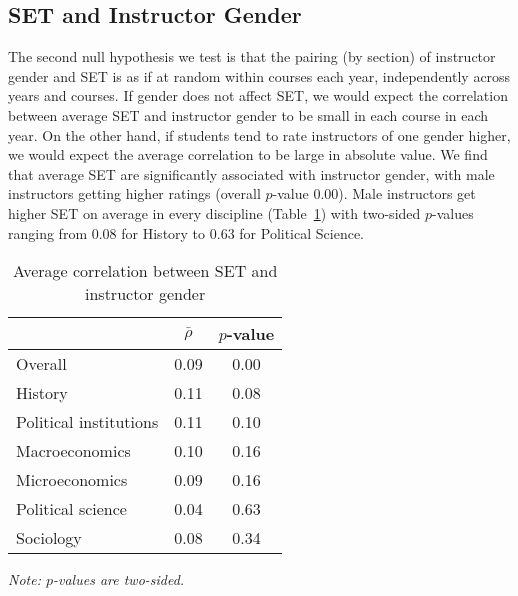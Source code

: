 \documentclass[12pt]{article}
\begin{document}
\subsection{SET and Instructor Gender} \label{sec:Fr-set-gender}
The second null hypothesis we test is that the pairing (by section) of 
instructor gender and SET is as if at random within courses each year, independently
across years and courses.
If gender does not affect SET, we would expect the correlation between average SET
and instructor gender to be small in each course in each year.
On the other hand, if students tend to rate instructors of one gender higher, we would
expect the average correlation to be large in absolute value.
We find that average SET are significantly associated with instructor gender, with male instructors
getting higher ratings (overall $p$-value 0.00). 
Male instructors get higher SET on average in every discipline  (Table~\ref{tab:instructorgender})
with two-sided $p$-values ranging from $0.08$ for 
History to $0.63$ for Political Science.

\begin{table}[htbp]
  \centering
  \footnotesize 
  \caption{Average correlation between SET and instructor gender}
    \begin{tabular}{lcc}
    \toprule 
                          & $\bar{\rho}$  & $p$-value     \\
   \midrule
    Overall &                 0.09       & 0.00     \\
    History &                 0.11       & 0.08     \\
    Political institutions &  0.11       & 0.10     \\
    Macroeconomics &          0.10       & 0.16     \\
    Microeconomics &          0.09       & 0.16     \\
    Political science &      0.04      & 0.63     \\
    Sociology &               0.08       & 0.34     \\
    \bottomrule
    \end{tabular}%
 \label{tab:instructorgender}%
  
  \textit{Note: $p$-values are two-sided.}
\end{table}%
\normalsize
\end{document}
